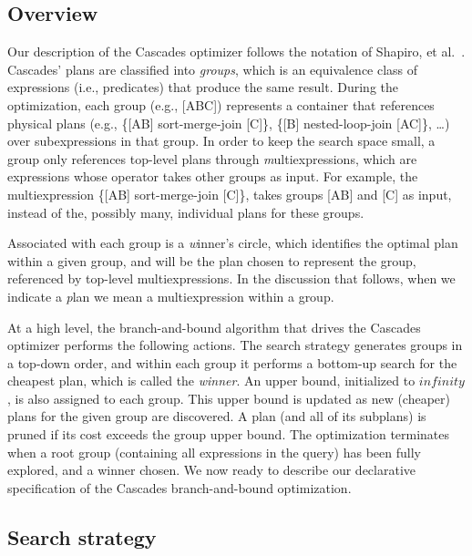 \subsection{Overview}
\label{ch:opt:sec:overview}

Our description of the Cascades optimizer follows the notation of Shapiro, et
al.~\cite{Shapiro-opt}.  Cascades' plans are classified into {\em groups},
which is an equivalence class of expressions (i.e., predicates) that produce
the same result.  During the optimization, each group (e.g., [ABC]) represents
a container that references physical plans (e.g., \{[AB] sort-merge-join
[C]\}, \{[B] nested-loop-join [AC]\}, \ldots) over subexpressions in that
group.  In order to keep the search space small, a group only references
top-level plans through {\emph multiexpressions}, which are expressions whose
operator takes other groups as input. For example, the multiexpression \{[AB]
sort-merge-join [C]\}, takes groups [AB] and [C] as input, instead of the,
possibly many, individual plans for these groups.  

Associated with each group is a {\emph winner's circle}, which identifies the
optimal plan within a given group, and will be the plan chosen to represent the
group, referenced by top-level multiexpressions.  In the discussion that follows,
when we indicate a {\emph plan} we mean a multiexpression within a group.

At a high level, the branch-and-bound algorithm that drives the Cascades
optimizer performs the following actions.  The search strategy generates groups
in a top-down order, and within each group it performs a bottom-up search for
the cheapest plan, which is called the {\em winner}.  An upper bound,
initialized to $infinity$, is also assigned to each group.  This upper bound is
updated as new (cheaper) plans for the given group are discovered.  A plan (and
all of its subplans) is pruned if its cost exceeds the group upper bound.  The
optimization terminates when a root group (containing all expressions in the
query) has been fully explored, and a winner chosen.  We now ready to describe
our declarative specification of the Cascades branch-and-bound optimization.

\subsection{Search strategy}
\label{ch:opt:sec:cascades_search}

